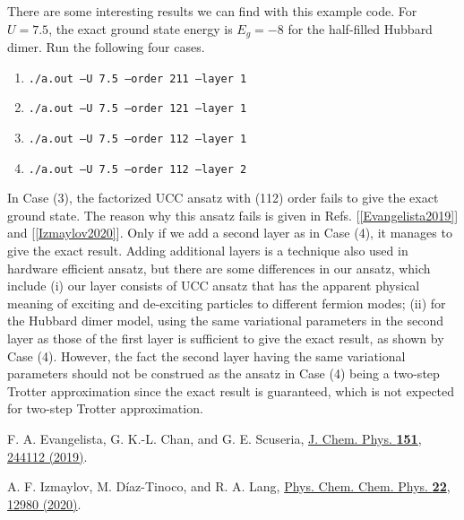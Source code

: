 There are some interesting results we can find with this example code. For $U=7.5$, the exact ground state energy is $E_g = -8$ for the half-filled Hubbard dimer. Run the following four cases.
\begin{enumerate}[label=(\arabic*),topsep=0pt,itemsep=0pt,partopsep=0pt, parsep=0pt]
\item \texttt{./a.out --U 7.5 --order 211 --layer 1}
\item \texttt{./a.out --U 7.5 --order 121 --layer 1}
\item \texttt{./a.out --U 7.5 --order 112 --layer 1}
\item \texttt{./a.out --U 7.5 --order 112 --layer 2}
\end{enumerate}
In Case (3), the factorized UCC ansatz with (112) order fails to give the exact ground state. The reason why this ansatz fails is given in Refs. [\ref{Evangelista2019}] and [\ref{Izmaylov2020}]. Only if we add a second layer as in Case (4), it manages to give the exact result. Adding additional layers is a technique also used in hardware efficient ansatz, but there are some differences in our ansatz, which include (i) our layer consists of UCC ansatz that has the apparent physical meaning of exciting and de-exciting particles to different fermion modes; (ii) for the Hubbard dimer model, using the same variational parameters in the second layer as those of the first layer is sufficient to give the exact result, as shown by Case (4). However, the fact the second layer having the same variational parameters should not be construed as the ansatz in Case (4) being a two-step Trotter approximation since the exact result is guaranteed, which is not expected for two-step Trotter approximation.

\begin{enumerate}[label={[\arabic*]},ref={\arabic*},leftmargin=*,align=left,topsep=0pt,itemsep=0pt,partopsep=2pt, parsep=0pt]
\hypersetup{urlcolor=blue}
\item \label{Evangelista2019}
F. A. Evangelista, G. K.-L. Chan, and G. E. Scuseria, \href{https://doi.org/10.1063/1.5133059}{J. Chem. Phys. \textbf{151}, 244112 (2019)}.
\item \label{Izmaylov2020}
A. F. Izmaylov, M. D\'{i}az-Tinoco, and R. A. Lang, \href{https://doi.org/10.1039/D0CP01707H}{Phys. Chem. Chem. Phys. \textbf{22}, 12980 (2020)}.
\end{enumerate}

\inputminted[autogobble,fontsize=\footnotesize,linenos,bgcolor=gray]{cpp}{example_code/hubbard_dimer_ex.cpp}
